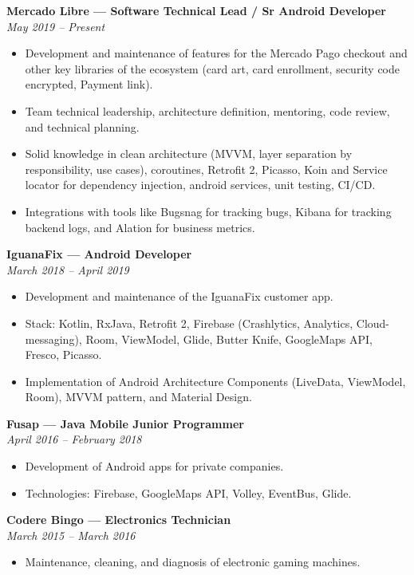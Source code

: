 \documentclass[11pt,a4paper]{article}
\newcommand{\jobtitle}[2]{
    \noindent\textbf{#1}\\
    \textit{#2}\par\vspace{0.5em}
}
\begin{document}
\jobtitle{Mercado Libre — Software Technical Lead / Sr Android Developer}{May 2019 – Present}
\begin{itemize}[leftmargin=*]
    \item Development and maintenance of features for the Mercado Pago checkout and other key libraries of the ecosystem (card art, card enrollment, security code encrypted, Payment link).
    \item Team technical leadership, architecture definition, mentoring, code review, and technical planning.
    \item Solid knowledge in clean architecture (MVVM, layer separation by responsibility, use cases), coroutines, Retrofit 2, Picasso, Koin and Service locator for dependency injection, android services, unit testing, CI/CD.
    \item Integrations with tools like Bugsnag for tracking bugs, Kibana for tracking backend logs, and Alation for business metrics.
\end{itemize}

\jobtitle{IguanaFix — Android Developer}{March 2018 – April 2019}
\begin{itemize}[leftmargin=*]
    \item Development and maintenance of the IguanaFix customer app.
    \item Stack: Kotlin, RxJava, Retrofit 2, Firebase (Crashlytics, Analytics, Cloud-messaging), Room, ViewModel, Glide, Butter Knife, GoogleMaps API, Fresco, Picasso.
    \item Implementation of Android Architecture Components (LiveData, ViewModel, Room), MVVM pattern, and Material Design.
\end{itemize}

\jobtitle{Fusap — Java Mobile Junior Programmer}{April 2016 – February 2018}
\begin{itemize}[leftmargin=*]
    \item Development of Android apps for private companies.
    \item Technologies: Firebase, GoogleMaps API, Volley, EventBus, Glide.
\end{itemize}

\jobtitle{Codere Bingo — Electronics Technician}{March 2015 – March 2016}
\begin{itemize}[leftmargin=*]
    \item Maintenance, cleaning, and diagnosis of electronic gaming machines.
\end{itemize}
\end{document}
